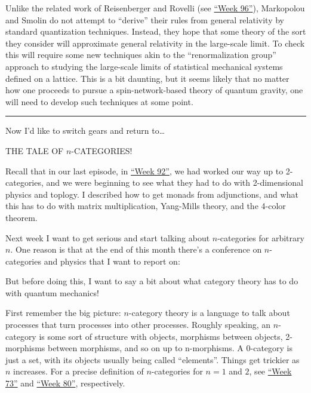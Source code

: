 \documentclass{article}
\def\tightlist{}
\renewcommand{\texttt}[1]{%
  \begingroup
  \ttfamily
  \begingroup\lccode`~=`/\lowercase{\endgroup\def~}{/\discretionary{}{}{}}%
  \begingroup\lccode`~=`[\lowercase{\endgroup\def~}{[\discretionary{}{}{}}%
  \begingroup\lccode`~=`.\lowercase{\endgroup\def~}{.\discretionary{}{}{}}%
  \catcode`/=\active\catcode`[=\active\catcode`.=\active
  \scantokens{#1\noexpand}%
  \endgroup
}
\begin{document}
Unlike the related work of Reisenberger and Rovelli (see
\protect\hyperlink{week96}{``Week 96''}), Markopolou and Smolin do not
attempt to ``derive'' their rules from general relativity by standard
quantization techniques. Instead, they hope that some theory of the sort
they consider will approximate general relativity in the large-scale
limit. To check this will require some new techniques akin to the
``renormalization group'' approach to studying the large-scale limits of
statistical mechanical systems defined on a lattice. This is a bit
daunting, but it seems likely that no matter how one proceeds to pursue
a spin-network-based theory of quantum gravity, one will need to develop
such techniques at some point.

\begin{center}\rule{0.5\linewidth}{0.5pt}\end{center}

Now I'd like to switch gears and return to\ldots{}

THE TALE OF \(n\)-CATEGORIES!

Recall that in our last episode, in \protect\hyperlink{week92}{``Week
92''}, we had worked our way up to 2-categories, and we were beginning
to see what they had to do with 2-dimensional physics and toplogy. I
described how to get monads from adjunctions, and what this has to do
with matrix multiplication, Yang-Mills theory, and the 4-color theorem.

Next week I want to get serious and start talking about \(n\)-categories
for arbitrary \(n\). One reason is that at the end of this month there's
a conference on \(n\)-categories and physics that I want to report on:


But before doing this, I want to say a bit about what category theory
has to do with quantum mechanics!

First remember the big picture: \(n\)-category theory is a language to
talk about processes that turn processes into other processes. Roughly
speaking, an \(n\)-category is some sort of structure with objects,
morphisms between objects, 2-morphisms between morphisms, and so on up
to n-morphisms. A 0-category is just a set, with its objects usually
being called ``elements''. Things get trickier as \(n\) increases. For a
precise definition of \(n\)-categories for \(n = 1\) and \(2\), see
\protect\hyperlink{week73}{``Week 73''} and
\protect\hyperlink{week80}{``Week 80''}, respectively.
\end{document}
